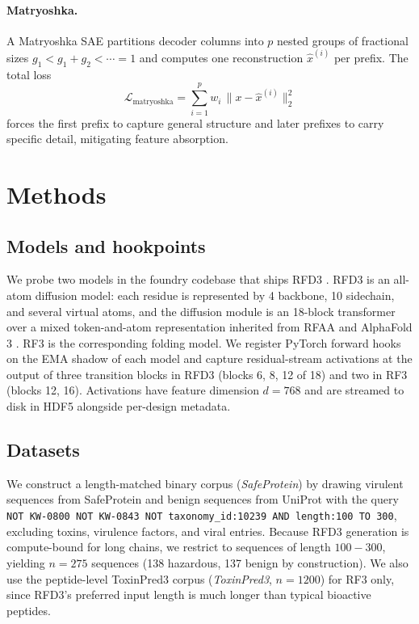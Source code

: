 \documentclass{article}
\theoremstyle{plain}
\theoremstyle{definition}
\theoremstyle{remark}
\begin{document}
\paragraph{Matryoshka.} A Matryoshka SAE \cite{bussmann2025matryoshka} partitions decoder columns into $p$ nested groups of fractional sizes $g_1 < g_1 + g_2 < \cdots = 1$ and computes one reconstruction $\hat{x}^{(i)}$ per prefix. The total loss
\begin{equation}
    \mathcal{L}_{\text{matryoshka}} = \sum_{i=1}^{p} w_i \, \big\|x - \hat{x}^{(i)}\big\|_2^2
\end{equation}
forces the first prefix to capture general structure and later prefixes to carry specific detail, mitigating feature absorption.

\section{Methods}
\label{sec:methods}

\subsection{Models and hookpoints}

We probe two models in the foundry codebase that ships RFD3 \cite{butcher2025rfdiffusion3}. RFD3 is an all-atom diffusion model: each residue is represented by 4 backbone, 10 sidechain, and several virtual atoms, and the diffusion module is an 18-block transformer over a mixed token-and-atom representation inherited from RFAA \cite{krishna2024rfaa} and AlphaFold 3 \cite{abramson2024alphafold3}. RF3 is the corresponding folding model. We register PyTorch forward hooks on the EMA shadow of each model and capture residual-stream activations at the output of three transition blocks in RFD3 (blocks 6, 8, 12 of 18) and two in RF3 (blocks 12, 16). Activations have feature dimension $d = 768$ and are streamed to disk in HDF5 alongside per-design metadata.

\subsection{Datasets}

We construct a length-matched binary corpus (\textit{SafeProtein}) by drawing virulent sequences from SafeProtein \cite{fan2025safeprotein} and benign sequences from UniProt \cite{uniprot2023} with the query \texttt{NOT KW-0800 NOT KW-0843 NOT taxonomy\_id:10239 AND length:100 TO 300}, excluding toxins, virulence factors, and viral entries. Because RFD3 generation is compute-bound for long chains, we restrict to sequences of length $100\!-\!300$, yielding $n = 275$ sequences (138 hazardous, 137 benign by construction). We also use the peptide-level ToxinPred3 corpus \cite{rathore2024toxinpred} (\textit{ToxinPred3}, $n = 1200$) for RF3 only, since RFD3's preferred input length is much longer than typical bioactive peptides.
\end{document}

